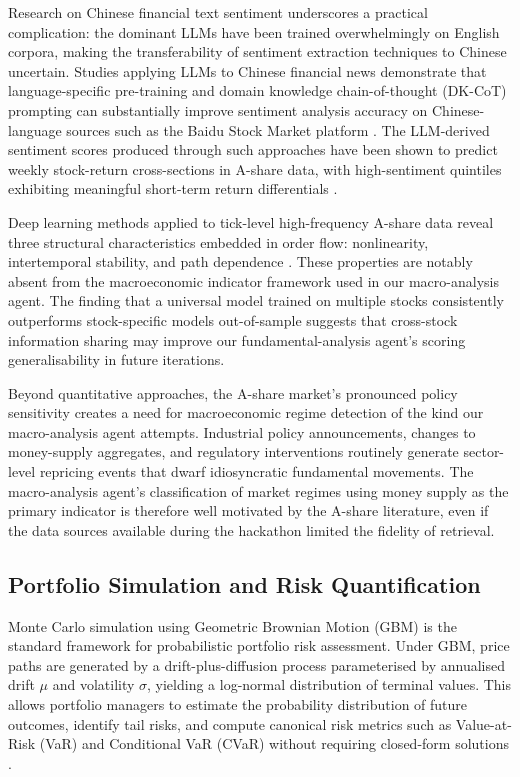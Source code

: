 \documentclass[11pt,a4paper]{article}
\begin{document}
Research on Chinese financial text sentiment underscores a practical
complication: the dominant LLMs have been trained overwhelmingly on
English corpora, making the transferability of sentiment extraction
techniques to Chinese uncertain. Studies applying LLMs to Chinese
financial news demonstrate that language-specific pre-training and
domain knowledge chain-of-thought (DK-CoT) prompting can substantially
improve sentiment analysis accuracy on Chinese-language sources such as
the Baidu Stock Market platform \cite{springer2025dkcot}. The
LLM-derived sentiment scores produced through such approaches have been
shown to predict weekly stock-return cross-sections in A-share data,
with high-sentiment quintiles exhibiting meaningful short-term return
differentials \cite{zheng2025sentiment}.

Deep learning methods applied to tick-level high-frequency A-share data
reveal three structural characteristics embedded in order flow:
nonlinearity, intertemporal stability, and path dependence
\cite{yu2025priceformation}. These properties are notably absent from
the macroeconomic indicator framework used in our macro-analysis agent.
The finding that a universal model trained on multiple stocks
consistently outperforms stock-specific models out-of-sample suggests
that cross-stock information sharing may improve our fundamental-analysis
agent's scoring generalisability in future iterations.

Beyond quantitative approaches, the A-share market's pronounced policy
sensitivity creates a need for macroeconomic regime detection of the
kind our macro-analysis agent attempts. Industrial policy announcements,
changes to money-supply aggregates, and regulatory interventions
routinely generate sector-level repricing events that dwarf idiosyncratic
fundamental movements. The macro-analysis agent's classification of
market regimes using money supply as the primary indicator is therefore
well motivated by the A-share literature, even if the data sources
available during the hackathon limited the fidelity of retrieval.

\subsection{Portfolio Simulation and Risk Quantification}

Monte Carlo simulation using Geometric Brownian Motion (GBM) is the
standard framework for probabilistic portfolio risk assessment. Under
GBM, price paths are generated by a drift-plus-diffusion process
parameterised by annualised drift $\mu$ and volatility $\sigma$,
yielding a log-normal distribution of terminal values. This allows
portfolio managers to estimate the probability distribution of future
outcomes, identify tail risks, and compute canonical risk metrics such
as Value-at-Risk (VaR) and Conditional VaR (CVaR) without requiring
closed-form solutions \cite{simsek2023montecarlo}.
\end{document}

